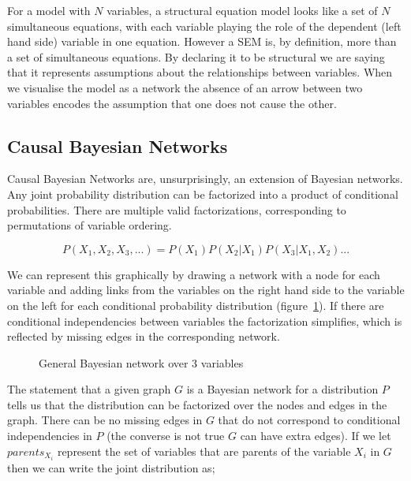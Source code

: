 \documentclass[11pt,a4paper]{article}
\begin{document}
For a model with $N$ variables, a structural equation model looks like a set of $N$ simultaneous equations, with each variable playing the role of the dependent (left hand side) variable in one equation. However a SEM is, by definition, more than a set of simultaneous equations. By declaring it to be structural we are saying that it represents assumptions about the relationships between variables. When we visualise the model as a network the absence of an arrow between two variables encodes the assumption that one does not cause the other.


\subsection{Causal Bayesian Networks}
Causal Bayesian Networks are, unsurprisingly, an extension of Bayesian networks. Any joint probability distribution can be factorized into a product of conditional probabilities. There are multiple valid factorizations, corresponding to permutations of variable ordering.

\begin{equation}
P(X_{1},X_{2},X_{3},...)=P(X_{1})P(X_{2}|X_{1})P(X_{3}|X_{1},X_{2})...
\end{equation}

We can represent this graphically by drawing a network with a node for each variable and adding links from the variables on the right hand side to the variable on the left for each conditional probability distribution (figure~\ref{fig:bayesnet}). If there are conditional independencies between variables the factorization simplifies, which is reflected by missing edges in the corresponding network. 

\begin{figure}[h]
\centering
\caption{General Bayesian network over 3 variables}
\label{fig:bayesnet}
\end{figure}

The statement that a given graph $G$ is a Bayesian network for a distribution $P$ tells us that the distribution can be factorized over the nodes and edges in the graph. There can be no missing edges in $G$ that do not correspond to conditional independencies in $P$ (the converse is not true $G$ can have extra edges). If we let $parents_{X_{i}}$ represent the set of variables that are parents of the variable $X_{i}$ in $G$ then we can write the joint distribution as; 
\end{document}
